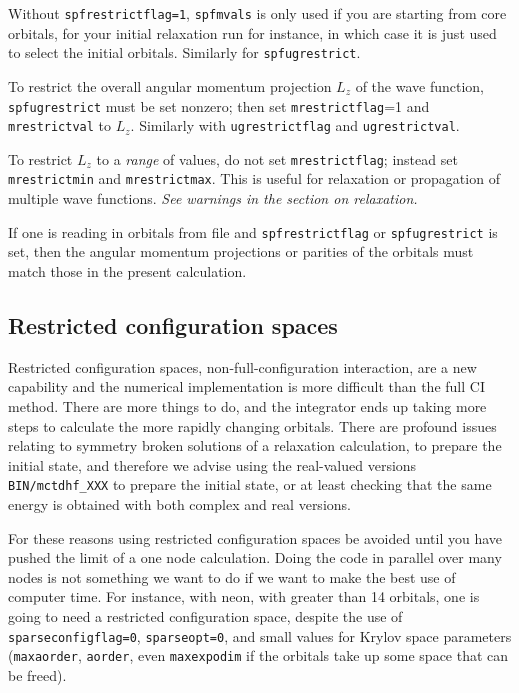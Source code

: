 \documentclass[10pt,leqno, oneside]{book}
\begin{document}
Without \verb#spfrestrictflag=1#, \verb#spfmvals# is only used if you are starting
from core orbitals, for your initial relaxation run for instance, in which case it is just used to select the initial orbitals.
Similarly for \verb#spfugrestrict#.

To restrict the overall angular momentum projection $L_z$ of the wave function, \verb#spfugrestrict# must be set nonzero;
then set \verb#mrestrictflag#=1 and \verb#mrestrictval# to $L_z$.  Similarly with \verb#ugrestrictflag# and \verb#ugrestrictval#.

To restrict $L_z$ to a \textit{range} of values, do not set \verb#mrestrictflag#; instead set \verb#mrestrictmin# and \verb#mrestrictmax#.  This is useful for relaxation
or propagation of multiple wave functions. \textit{See warnings in the section on relaxation.}

If one is reading in orbitals from file and \verb#spfrestrictflag# or \verb#spfugrestrict# is set, then the angular momentum projections or parities of the
orbitals must match those in the present calculation.

\subsection{Restricted configuration spaces}

Restricted configuration spaces, non-full-configuration interaction,
are a new capability and the numerical implementation is more difficult than the full CI method.  There are more things to do, and the integrator
ends up taking more steps to calculate the more rapidly changing orbitals.  There are profound issues relating to symmetry broken solutions of 
a relaxation calculation, to prepare the initial state, and therefore we advise using the real-valued versions \verb#BIN/mctdhf_XXX# to prepare the
initial state, or at least checking that the same energy is obtained with both complex and real versions.

For these reasons using restricted configuration spaces
be avoided until you have pushed the limit of a one node calculation.  Doing the code in parallel over many nodes is not something we want
to do if we want to make the best use of computer time.
For instance, with neon, with greater than 14 orbitals, one is going to need
a restricted configuration space, despite the use of \verb#sparseconfigflag=0#, \verb#sparseopt=0#, and small values for Krylov space parameters
(\verb#maxaorder#, \verb#aorder#, even \verb#maxexpodim# if the orbitals take up some space that can be freed).
\end{document}
